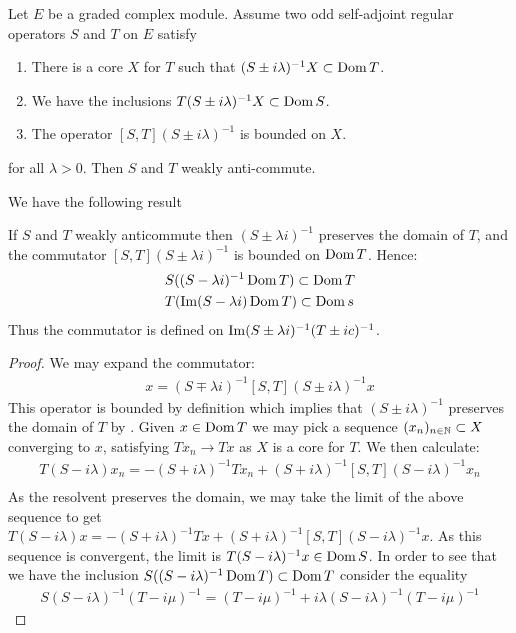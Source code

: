 \begin{definition}
	Let $E$ be a graded complex \Cstar module. Assume two odd self-adjoint regular operators $S$ and $T$ on $E$ satisfy 
	\begin{enumerate}
	\item
		There is a core $X$ for $T$ such that $(S\pm i\lambda)^{-1}X\subset \operatorname{Dom} T$. 
	\item
		We have the inclusions $T(S\pm i\lambda)^{-1}X\subset \operatorname{Dom} S$. 
	\item
		The operator $[S,T](S\pm i\lambda)^{-1}$ is bounded on $X$. 
	\end{enumerate}
	for all $\lambda>0$. Then $S$ and $T$ weakly anti-commute.
\end{definition}
We have the following result 
\begin{lemma}\label{boundedness}
	If $S$ and $T$ weakly anticommute then $(S\pm \lambda i)^{-1}$ preserves the domain of $T$, and the commutator $[S,T](S\pm \lambda i)^{-1}$ is bounded on $\operatorname{Dom} T$. Hence: 
	\begin{align*}
		&S((S-\lambda i)^{-1}\operatorname{Dom} T)\subset \operatorname{Dom} T \\ 
		&T(\operatorname{Im}(S-\lambda i)\operatorname{Dom} T)\subset \operatorname{Dom} s
	\end{align*}
	Thus the commutator is defined on $\operatorname{Im} (S\pm \lambda i)^{-1}(T\pm ic)^{-1}$.  
\end{lemma}
\begin{proof}
	We may expand the commutator: 
	\begin{align*}
		[T,(S+i\lambda)^{-1}]x=(S\mp \lambda i)^{-1}[S,T](S\pm i\lambda)^{-1}x
	\end{align*}
	This operator is bounded by definition which implies that $(S\pm i\lambda)^{-1}$ preserves the domain of $T$ by \cite[Proposition 2.1]{forsyth}. Given $x\in \operatorname{Dom} T$ we may pick a sequence $(x_n)_{n\in \mathbb{N}}\subset X$ converging to $x$, satisfying $Tx_n\to Tx$ as $X$ is a core for $T$. We then calculate:
	\begin{align*}
		T(S-i\lambda)x_n=-(S+i\lambda)^{-1}Tx_n+(S+i\lambda)^{-1}[S,T](S-i\lambda)^{-1}x_n \\
	\end{align*}
	As the resolvent preserves the domain, we may take the limit of the above sequence to get $T(S-i\lambda)x=-(S+i\lambda)^{-1}Tx+(S+i\lambda)^{-1}[S,T](S-i\lambda)^{-1}x $.
	As this sequence is convergent, the limit is $T(S-i\lambda)^{-1}x\in \operatorname{Dom} S$. In order to see that we have the inclusion $S((S-i\lambda)^{-1}\operatorname{Dom} T)\subset \operatorname{Dom} T$ consider the equality 
	\begin{align*}
		S(S-i\lambda)^{-1}(T-i\mu)^{-1}=(T-i\mu)^{-1}+i\lambda(S-i\lambda)^{-1}(T-i\mu)^{-1}
	\end{align*}
\end{proof}
